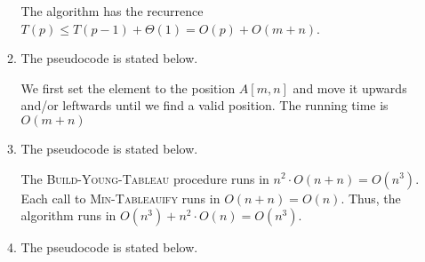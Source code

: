 \documentclass{report}
\makeatletter
\renewenvironment{framed}{%
 \def\FrameCommand##1{\hskip\@totalleftmargin
 \fboxsep=\FrameSep\fbox{##1}}%
 \MakeFramed {\advance\hsize-\width
   \@totalleftmargin\z@ \linewidth\hsize
   \@setminipage}}%
 {\par\unskip\endMakeFramed}
\makeatother
\begin{document}
\begin{enumerate}
\begin{framed}
\begin{enumerate}
The algorithm has the recurrence $T(p) \le T(p - 1) + \Theta(1) = O(p) + O(m + n)$.

\item The pseudocode is stated below.

\begin{algorithm}[H]
\SetAlgoNoEnd\DontPrintSemicolon
\BlankLine
{}
\end{algorithm}

We first set the element to the position $A[m, n]$ and move it upwards and/or
leftwards until we find a valid position. The running time is $O(m + n)$

\item The pseudocode is stated below.

\begin{algorithm}[H]
\SetAlgoNoEnd\DontPrintSemicolon
\BlankLine
{}
\end{algorithm}

\begin{algorithm}[H]
\SetAlgoNoEnd\DontPrintSemicolon
\BlankLine
{}
\end{algorithm}

The \textsc{Build-Young-Tableau} procedure runs in
$n^2 \cdot O(n + n) = O(n^3)$. Each call to \textsc{Min-Tableauify} runs in
$O(n + n) = O(n)$. Thus, the algorithm runs in
$O(n^3) + n^2 \cdot O(n) = O(n^3)$.

\item The pseudocode is stated below.


\end{enumerate}
\end{framed}
\end{enumerate}
\end{document}
